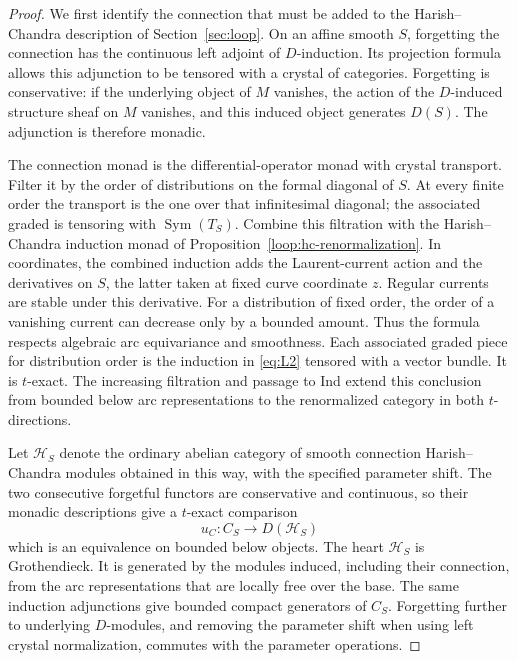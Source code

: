 \documentclass[11pt]{article}
\numberwithin{equation}{section}
\theoremstyle{definition}
\theoremstyle{remark}
\begin{document}
\begin{proof}
We first identify the connection that must be added to the
Harish--Chandra description of Section~\ref{sec:loop}.  On an affine
smooth $S$, forgetting the connection has the continuous left adjoint
of $D$-induction.  Its projection formula allows this adjunction to be
tensored with a crystal of categories.  Forgetting is conservative:
if the underlying object of $M$ vanishes, the action of the
$D$-induced structure sheaf on $M$ vanishes, and this induced object
generates $D(S)$.  The adjunction is therefore monadic.

The connection monad is the differential-operator monad with crystal
transport.  Filter it by the order of distributions on the formal
diagonal of $S$.  At every finite order the transport is the one over
that infinitesimal diagonal; the associated graded is tensoring with
$\operatorname{Sym}(T_S)$.  Combine this filtration with the
Harish--Chandra induction monad of Proposition~\ref{loop:hc-renormalization}.
In coordinates, the combined induction adds the Laurent-current
action and the derivatives on $S$, the latter taken at fixed curve
coordinate $z$.  Regular currents are stable under this derivative.
For a distribution of fixed order, the order of a vanishing current
can decrease only by a bounded amount.  Thus the formula respects
algebraic arc equivariance and smoothness.  Each associated graded
piece for distribution order is the induction in \eqref{eq:L2}
tensored with a vector bundle.  It is $t$-exact.  The increasing
filtration and passage to Ind extend this conclusion from bounded
below arc representations to the renormalized category in both
$t$-directions.

Let $\mathcal H_S$ denote the ordinary abelian category of smooth
connection Harish--Chandra modules obtained in this way, with the
specified parameter shift.  The two consecutive forgetful functors
are conservative and continuous, so their monadic descriptions give
a $t$-exact comparison
\[
                       u_C:C_S\longrightarrow D(\mathcal H_S)
\]
which is an equivalence on bounded below objects.  The heart
$\mathcal H_S$ is Grothendieck.  It is generated by the modules induced,
including their connection, from the arc representations that are
locally free over the base.  The same induction adjunctions give
bounded compact generators of $C_S$.  Forgetting further to underlying
$D$-modules, and removing the parameter shift when using left crystal
normalization, commutes with the parameter operations.


\end{proof}
\end{document}
